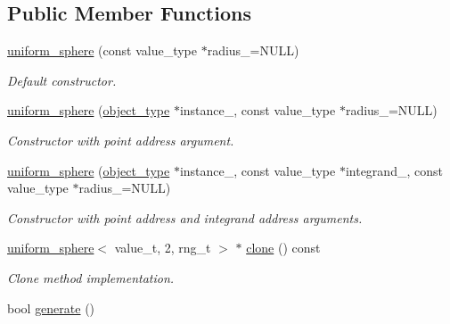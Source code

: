 \subsection*{Public Member Functions}
\begin{DoxyCompactItemize}
\item 
\hypertarget{a00568_a34dcefaa7aae30e4bcaeead1171080e6}{}\hyperlink{a00568_a34dcefaa7aae30e4bcaeead1171080e6}{uniform\+\_\+sphere} (const value\+\_\+type $\ast$radius\+\_\+=N\+U\+L\+L)\label{a00568_a34dcefaa7aae30e4bcaeead1171080e6}

\begin{DoxyCompactList}\small\item\em Default constructor. \end{DoxyCompactList}\item 
\hypertarget{a00568_a99d9ed1840851e9a7eb5ba23665125ca}{}\hyperlink{a00568_a99d9ed1840851e9a7eb5ba23665125ca}{uniform\+\_\+sphere} (\hyperlink{a00579}{object\+\_\+type} $\ast$instance\+\_\+, const value\+\_\+type $\ast$radius\+\_\+=N\+U\+L\+L)\label{a00568_a99d9ed1840851e9a7eb5ba23665125ca}

\begin{DoxyCompactList}\small\item\em Constructor with point address argument. \end{DoxyCompactList}\item 
\hypertarget{a00568_aff8dd1a90f5170e5101ace822913adcf}{}\hyperlink{a00568_aff8dd1a90f5170e5101ace822913adcf}{uniform\+\_\+sphere} (\hyperlink{a00579}{object\+\_\+type} $\ast$instance\+\_\+, const value\+\_\+type $\ast$integrand\+\_\+, const value\+\_\+type $\ast$radius\+\_\+=N\+U\+L\+L)\label{a00568_aff8dd1a90f5170e5101ace822913adcf}

\begin{DoxyCompactList}\small\item\em Constructor with point address and integrand address arguments. \end{DoxyCompactList}\item 
\hypertarget{a00568_ab1b1701d99a99a692e98f7792487d052}{}\hyperlink{a00566}{uniform\+\_\+sphere}$<$ value\+\_\+t, 2, rng\+\_\+t $>$ $\ast$ \hyperlink{a00568_ab1b1701d99a99a692e98f7792487d052}{clone} () const \label{a00568_ab1b1701d99a99a692e98f7792487d052}

\begin{DoxyCompactList}\small\item\em Clone method implementation. \end{DoxyCompactList}\item 
\hypertarget{a00568_ac011c9492251c5419ec4f88ff4cf8c9a}{}bool \hyperlink{a00568_ac011c9492251c5419ec4f88ff4cf8c9a}{generate} ()\label{a00568_ac011c9492251c5419ec4f88ff4cf8c9a}


\end{DoxyCompactItemize}

